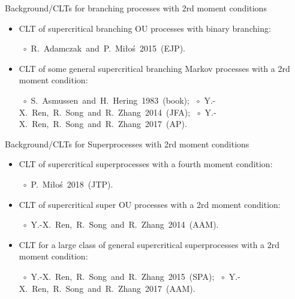 \documentclass[xcolor=dvipsnames]{beamer}
\begin{document}
\begin{frame}{Background/CLTs for branching processes with 2rd moment conditions}
\begin{itemize} 
\item
  {\color{red} CLT of supercritical branching OU processes} with binary branching: 

  \mbox{ $\circ$ R. Adamczak and P. Mi{\l}o{\'s} 2015 (EJP).}
\item
	{\color{red} CLT of some general supercritical branching Markov processes} with a 2rd moment condition:
  
  \mbox{ $\circ$ S. Asmussen and H. Hering 1983 (book);}
  \mbox{ $\circ$ Y.-X. Ren, R. Song and R. Zhang 2014 (JFA);}
  \mbox{ $\circ$ Y.-X. Ren, R. Song and R. Zhang 2017 (AP).}
\end{itemize}
\let\thefootnote\relax{}
\end{frame}

\begin{frame}{Background/CLTs for Superprocesses with 2rd moment conditions}
\begin{itemize}
\item
	{\color{red} CLT of supercritical superprocesses} with a fourth moment condition:
  
  \mbox{ $\circ$ P. Mi{\l}o\'{s} 2018 (JTP).}
\item
	{\color{red} CLT of supercritical super OU processes} with a 2rd moment condition:
  
  \mbox{ $\circ$ Y.-X. Ren, R. Song and R. Zhang 2014 (AAM).}
\item
	{\color{red} CLT for a large class of general supercritical superprocesses} with a 2rd moment condition:
  
  \mbox{ $\circ$ Y.-X. Ren, R. Song and R. Zhang 2015 (SPA);}
  \mbox{ $\circ$ Y.-X. Ren, R. Song and R. Zhang 2017 (AAM).}
\end{itemize}
\end{frame}
\end{document}
